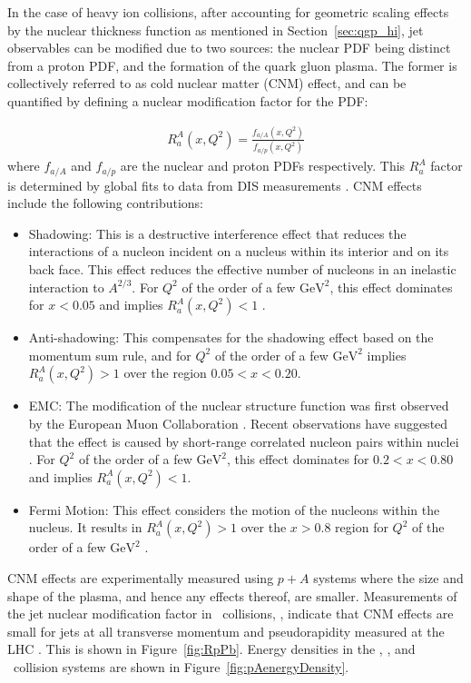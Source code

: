 In the case of heavy ion collisions, after accounting for geometric scaling effects by the nuclear thickness function as mentioned in Section~\ref{sec:qgp_hi},  jet observables can be modified due to two sources: the nuclear PDF being distinct from a proton PDF, and the formation of the quark gluon plasma.
The former is collectively referred to as cold nuclear matter (CNM) effect, and can be quantified by defining a nuclear modification factor for the PDF:

\begin{align}
R_a^A (x, Q^2) = \frac{f_{a/A} (x, Q^2)}{f_{a/p}(x, Q^2)}
\end{align}
where $f_{a/A}$ and $f_{a/p}$ are the nuclear and proton PDFs respectively.
This $R_a^A$ factor is determined by global fits to data from DIS measurements \cite{PhysRevC.76.065207, PhysRevD.69.074028, Eskola_2009}.
CNM effects include the following contributions:
\begin{itemize}
\item Shadowing: This is a destructive interference effect that reduces the interactions of a nucleon incident on a nucleus within its interior and on its back face.
This effect reduces the effective number of nucleons in an inelastic interaction to $A^{2/3}$.
For $Q^2$ of the order of a few $\mathrm{GeV}^2$, this effect dominates for $x < 0.05$ and implies $R_a^A (x, Q^2) < 1$  \cite{PhysRevLett.64.1342}.
\item Anti-shadowing: This compensates for the shadowing effect based on the momentum sum rule, and for $Q^2$ of the order of a few $\mathrm{GeV}^2$ implies $R_a^A (x, Q^2) > 1$ over the region $0.05 < x < 0.20$.
\item EMC: The modification of the nuclear structure function was first observed by the European Muon Collaboration \cite{AUBERT1983275}.
Recent observations have suggested that the effect is caused by short-range correlated nucleon pairs within nuclei \cite{PhysRevC.85.047301}.
For $Q^2$ of the order of a few $\mathrm{GeV}^2$, this effect dominates for $0.2 < x < 0.80$ and implies $R_a^A (x, Q^2) < 1$.
\item  Fermi Motion: This effect considers the motion of the nucleons within the nucleus.
It results in $R_a^A (x, Q^2) > 1$  over the $x > 0.8$ region for $Q^2$ of the order of a few $\mathrm{GeV}^2$ \cite{Saito:1985ct}.
\end{itemize}

CNM effects are experimentally measured using $p+A$ systems where the size and shape of the plasma, and hence any effects thereof, are smaller.
Measurements of the jet nuclear modification factor in \pPb\ collisions, \RpPb, indicate that CNM effects are small for jets at all transverse momentum and pseudorapidity measured at the LHC \cite{2015392, Adam2016, Khachatryan2016b}.
This is shown in Figure~\ref{fig:RpPb}.
Energy densities in the \pbpb, \pPb, and \pp\ collision systems are shown in Figure~\ref{fig:pAenergyDensity}.

